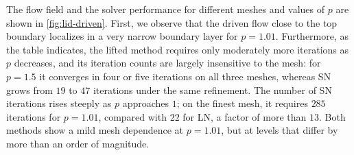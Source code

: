 \documentclass[11pt,pdflatex,sn-mathphys-num]{sn-jnl}
\theoremstyle{thmstyleone}%
\theoremstyle{thmstyletwo}%
\theoremstyle{thmstylethree}%
\begin{document}
The flow field and the solver performance for different meshes and values of $p$ are shown in \cref{fig:lid-driven}. First, we observe that the driven flow close to the top boundary localizes in a very narrow boundary layer for $p=1.01$. Furthermore, as the table indicates, the lifted method requires only moderately more iterations as $p$ decreases, and its iteration counts are largely insensitive to the mesh: for $p=1.5$ it converges in four or five iterations on all three meshes, whereas SN grows from $19$ to $47$ iterations under the same refinement. The number of SN iterations rises steeply as $p$ approaches $1$; on the finest mesh, it requires $285$ iterations for $p=1.01$, compared with $22$ for LN, a factor of more than $13$. Both methods show a mild mesh dependence at $p=1.01$, but at levels that differ by more than an order of magnitude.
\end{document}
